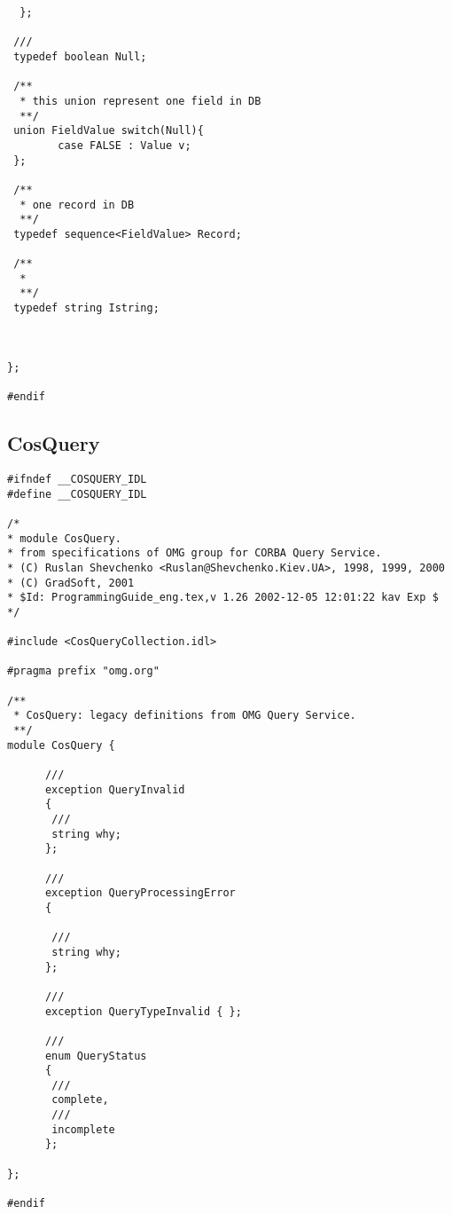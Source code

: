 \documentclass[10pt]{article}
\begin{document}
\begin{verbatim}
  };
 
 ///
 typedef boolean Null;

 /**
  * this union represent one field in DB
  **/
 union FieldValue switch(Null){
        case FALSE : Value v;
 };

 /**
  * one record in DB
  **/
 typedef sequence<FieldValue> Record;

 /**
  *
  **/
 typedef string Istring;



};

#endif
\end{verbatim}
\subsection{CosQuery}
\begin{verbatim}
#ifndef __COSQUERY_IDL
#define __COSQUERY_IDL

/*
* module CosQuery.
* from specifications of OMG group for CORBA Query Service.
* (C) Ruslan Shevchenko <Ruslan@Shevchenko.Kiev.UA>, 1998, 1999, 2000
* (C) GradSoft, 2001
* $Id: ProgrammingGuide_eng.tex,v 1.26 2002-12-05 12:01:22 kav Exp $
*/ 

#include <CosQueryCollection.idl>

#pragma prefix "omg.org"

/**
 * CosQuery: legacy definitions from OMG Query Service.
 **/
module CosQuery {

      ///
      exception QueryInvalid 
      { 
       ///
       string why; 
      };

      ///
      exception QueryProcessingError 
      { 

       ///
       string why; 
      };

      ///
      exception QueryTypeInvalid { };

      /// 
      enum QueryStatus 
      {
       ///
       complete, 
       ///
       incomplete
      };

};

#endif
\end{verbatim}
\end{document}
